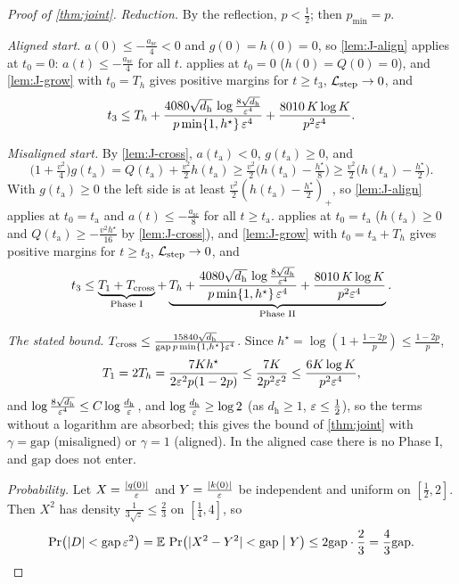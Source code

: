 \begin{proof}[Proof of \cref{thm:joint}]
\emph{Reduction.} By the reflection, $p<\frac{1}{2}$; then $p_{\min}=p$.

\emph{Aligned start.} $a(0)\le-\frac{a_{\mathrm{sc}}}{4}<0$ and $g(0)=h(0)=0$, so \cref{lem:J-align} applies at $t_0=0$: $a(t)\le-\frac{a_{\mathrm{sc}}}{4}$ for all $t$.
 applies at $t_0=0$ ($h(0)=Q(0)=0$), and
\cref{lem:J-grow} with $t_0=T_h$ gives positive margins for $t\ge t_3$, $\mathcal L_{\mathrm{step}}\to0$, and
\[
 t_3\le T_h+\frac{4080\sqrt{d_{\mathrm h}}\,\log\frac{8\sqrt{d_{\mathrm h}}}{\varepsilon^4}}{p\min\{1,h^\star\}\,\varepsilon^4}+\frac{8010\,K\log K}{p^2\varepsilon^4} .
\]

\emph{Misaligned start.} By \cref{lem:J-cross}, $a(t_{\mathrm a})<0$, $g(t_{\mathrm a})\ge0$, and
\[
 \bigl(1+\tfrac{v^2}{4}\bigr)g(t_{\mathrm a})=Q(t_{\mathrm a})+\tfrac{v^2}{2}h(t_{\mathrm a})\ge\tfrac{v^2}{2}\bigl(h(t_{\mathrm a})-\tfrac{h^\star}{8}\bigr)\ge\tfrac{v^2}{2}\bigl(h(t_{\mathrm a})-\tfrac{h^\star}{2}\bigr).
\]
With $g(t_{\mathrm a})\ge0$ the left side is at least $\frac{v^2}{2}(h(t_{\mathrm a})-\frac{h^\star}{2})_+$, so \cref{lem:J-align} applies at $t_0=t_{\mathrm a}$ and $a(t)\le-\frac{a_{\mathrm{sc}}}{8}$ for all $t\ge t_{\mathrm a}$. 
applies at $t_0=t_{\mathrm a}$ ($h(t_{\mathrm a})\ge0$ and $Q(t_{\mathrm a})\ge-\frac{v^2h^\star}{16}$ by \cref{lem:J-cross}), and \cref{lem:J-grow} with $t_0=t_{\mathrm a}+T_h$ gives positive margins for $t\ge t_3$, $\mathcal L_{\mathrm{step}}\to0$, and
\[
 t_3\le\underbrace{T_1+T_{\mathrm{cross}}}_{\text{Phase I}}+\underbrace{T_h+\frac{4080\sqrt{d_{\mathrm h}}\,\log\frac{8\sqrt{d_{\mathrm h}}}{\varepsilon^4}}{p\min\{1,h^\star\}\,\varepsilon^4}+\frac{8010\,K\log K}{p^2\varepsilon^4}}_{\text{Phase II}} .
\]

\emph{The stated bound.} $T_{\mathrm{cross}}\le\frac{15840\sqrt{d_{\mathrm h}}}{\mathrm{gap}\,p\min\{1,h^\star\}\varepsilon^4}$. Since $h^\star=\log(1+\frac{1-2p}{p})\le\frac{1-2p}{p}$,
\[
 T_1=2T_h=\frac{7Kh^\star}{2\varepsilon^2p(1-2p)}\le\frac{7K}{2p^2\varepsilon^2}\le\frac{6K\log K}{p^2\varepsilon^4},
\]
and $\log\frac{8\sqrt{d_{\mathrm h}}}{\varepsilon^4}\le C\log\frac{d_{\mathrm h}}{\varepsilon}$, and $\log\frac{d_{\mathrm h}}{\varepsilon}\ge\log2$ (as $d_{\mathrm h}\ge1$, $\varepsilon\le\frac12$), so the terms without a logarithm are absorbed; this gives the bound of \cref{thm:joint} with $\gamma=\mathrm{gap}$ (misaligned) or $\gamma=1$ (aligned). In the
aligned case there is no Phase I, and $\mathrm{gap}$ does not enter.

\emph{Probability.} Let $X=\frac{|q(0)|}{\varepsilon}$ and $Y=\frac{|k(0)|}{\varepsilon}$ be independent and uniform on $[\frac{1}{2},2]$. Then $X^2$ has density
$\frac{1}{3\sqrt z}\le\frac{2}{3}$ on $[\frac{1}{4},4]$, so
\[
 \Pr\bigl(|D|<\mathrm{gap}\,\initscale^2\bigr)=\E\,\Pr\bigl(|X^2-Y^2|<\mathrm{gap}\bigm|Y\bigr)\le2\mathrm{gap}\cdot\tfrac{2}{3}=\tfrac{4}{3}\mathrm{gap} .\qedhere
\]
\end{proof}

